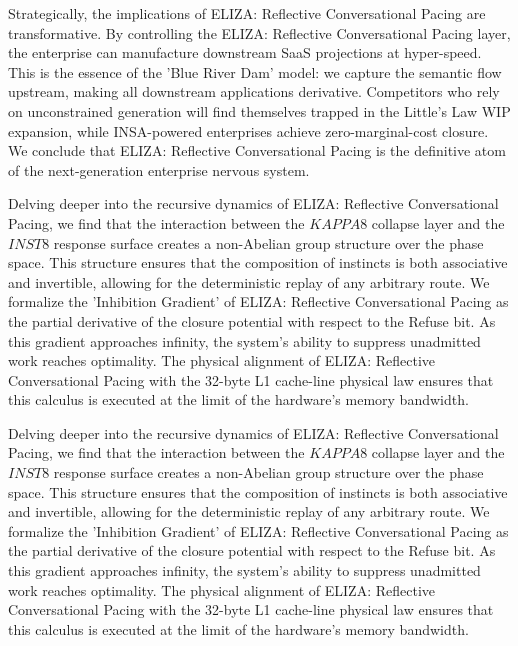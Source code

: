\documentclass[12pt,a4paper,oneside]{book}
\begin{document}
Strategically, the implications of ELIZA: Reflective Conversational Pacing are transformative. By controlling the ELIZA: Reflective Conversational Pacing layer, the enterprise can manufacture downstream SaaS projections at hyper-speed. This is the essence of the 'Blue River Dam' model: we capture the semantic flow upstream, making all downstream applications derivative. Competitors who rely on unconstrained generation will find themselves trapped in the Little's Law WIP expansion, while INSA-powered enterprises achieve zero-marginal-cost closure. We conclude that ELIZA: Reflective Conversational Pacing is the definitive atom of the next-generation enterprise nervous system. 

Delving deeper into the recursive dynamics of ELIZA: Reflective Conversational Pacing, we find that the interaction between the $KAPPA8$ collapse layer and the $INST8$ response surface creates a non-Abelian group structure over the phase space. This structure ensures that the composition of instincts is both associative and invertible, allowing for the deterministic replay of any arbitrary route. We formalize the 'Inhibition Gradient' of ELIZA: Reflective Conversational Pacing as the partial derivative of the closure potential with respect to the Refuse bit. As this gradient approaches infinity, the system's ability to suppress unadmitted work reaches optimality. The physical alignment of ELIZA: Reflective Conversational Pacing with the 32-byte L1 cache-line physical law ensures that this calculus is executed at the limit of the hardware's memory bandwidth. 

Delving deeper into the recursive dynamics of ELIZA: Reflective Conversational Pacing, we find that the interaction between the $KAPPA8$ collapse layer and the $INST8$ response surface creates a non-Abelian group structure over the phase space. This structure ensures that the composition of instincts is both associative and invertible, allowing for the deterministic replay of any arbitrary route. We formalize the 'Inhibition Gradient' of ELIZA: Reflective Conversational Pacing as the partial derivative of the closure potential with respect to the Refuse bit. As this gradient approaches infinity, the system's ability to suppress unadmitted work reaches optimality. The physical alignment of ELIZA: Reflective Conversational Pacing with the 32-byte L1 cache-line physical law ensures that this calculus is executed at the limit of the hardware's memory bandwidth. 
\end{document}
